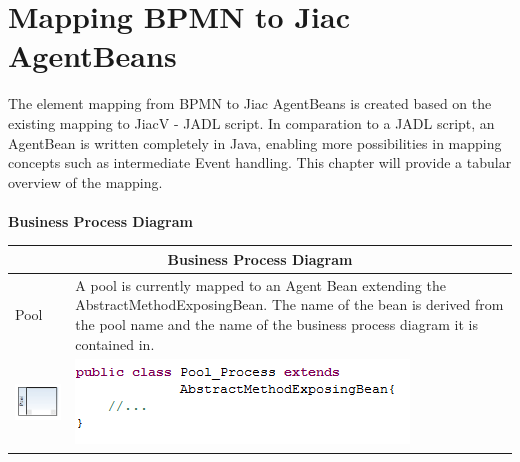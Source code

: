 \chapter{Mapping BPMN to Jiac AgentBeans}
\label{chap:mapping}
The element mapping from BPMN to Jiac AgentBeans is created based on the existing mapping to JiacV - JADL script. In comparation to a JADL script, an AgentBean is written completely in Java, enabling more possibilities in mapping concepts such as intermediate Event handling. This chapter will provide a tabular overview of the mapping.\\\\
\textbf{\large{Business Process Diagram}}\\
		\begin{tabularx}{\linewidth}{|l|X|}\hline\hline
			\multicolumn{2}{|c|}{\textbf{Business Process Diagram}} \\\hline\hline
			 Pool & A pool is currently mapped to an Agent Bean extending the AbstractMethodExposingBean. The name of the bean is derived from the pool name and the name of the business process diagram it is contained in.\\
			 \includegraphics{images/mapping/pool.png}  & \includegraphics{images/mapping/poolcode.png}\\\hline
			 \end{tabularx}\\\\
			 
